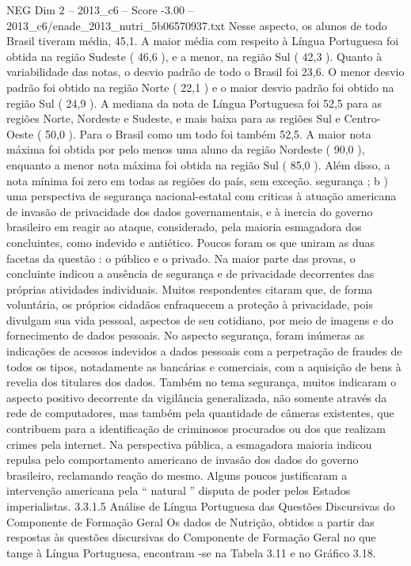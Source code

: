 \begin{textsample}{NEG Dim 2 – 2013\_c6 – Score -3.00 – 2013\_c6/enade\_2013\_nutri\_5b06570937.txt}
Nesse aspecto, os alunos de todo Brasil tiveram média, 45,1.
A maior média com respeito à Língua Portuguesa foi obtida na região Sudeste ( 46,6 ), e a menor, na região Sul ( 42,3 ).
Quanto à variabilidade das notas, o desvio padrão de todo o Brasil foi 23,6.
O menor desvio padrão foi obtido na região Norte ( 22,1 ) e o maior desvio padrão foi obtido na região Sul ( 24,9 ).
A mediana da nota de Língua Portuguesa foi 52,5 para as regiões Norte, Nordeste e Sudeste, e mais baixa para as regiões Sul e Centro-Oeste ( 50,0 ).
Para o Brasil como um todo foi também 52,5.
A maior nota máxima foi obtida por pelo menos uma aluno da região Nordeste ( 90,0 ), enquanto a menor nota máxima foi obtida na região Sul ( 85,0 ).
Além disso, a nota mínima foi zero em todas as regiões do país, sem exceção. segurança ; b ) uma perspectiva de segurança nacional-estatal com criticas à atuação americana de invasão de privacidade dos dados governamentais, e à inercia do governo brasileiro em reagir ao ataque, considerado, pela maioria esmagadora dos concluintes, como indevido e antiético.
Poucos foram os que uniram as duas facetas da questão : o público e o privado.
Na maior parte das provas, o concluinte indicou a ausência de segurança e de privacidade decorrentes das próprias atividades individuais.
Muitos respondentes citaram que, de forma voluntária, os próprios cidadãos enfraquecem a proteção à privacidade, pois divulgam sua vida pessoal, aspectos de seu cotidiano, por meio de imagens e do fornecimento de dados pessoais.
No aspecto segurança, foram inúmeras as indicações de acessos indevidos a dados pessoais com a perpetração de fraudes de todos os tipos, notadamente as bancárias e comerciais, com a aquisição de bens à revelia dos titulares dos dados.
Também no tema segurança, muitos indicaram o aspecto positivo decorrente da vigilância generalizada, não somente através da rede de computadores, mas também pela quantidade de câmeras existentes, que contribuem para a identificação de criminosos procurados ou dos que realizam crimes pela internet.
Na perspectiva pública, a esmagadora maioria indicou repulsa pelo comportamento americano de invasão dos dados do governo brasileiro, reclamando reação do mesmo.
Alguns poucos justificaram a intervenção americana pela “ natural ” disputa de poder pelos Estados imperialistas. 3.3.1.5 Análise de Língua Portuguesa das Questões Discursivas do Componente de Formação Geral Os dados de Nutrição, obtidos a partir das respostas às questões discursivas do Componente de Formação Geral no que tange à Língua Portuguesa, encontram -se na Tabela 3.11 e no Gráfico 3.18.

\end{textsample}
